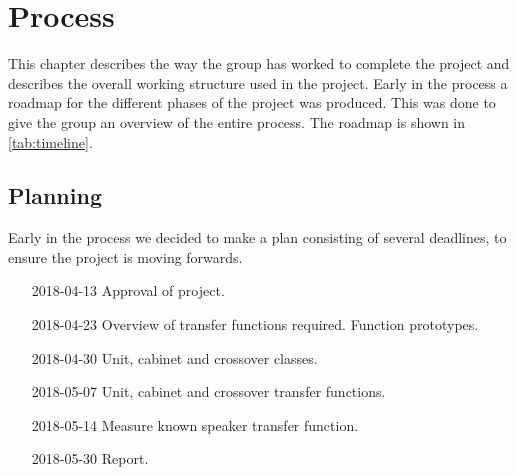 
\chapter{Process}
This chapter describes the way the group has worked to complete the project and describes the overall working structure used in the project.
Early in the process a roadmap for the different phases of the project was produced. This was done to give the group an overview of the entire process. The roadmap is shown in \cref{tab:timeline}.

\section{Planning}
Early in the process we decided to make a plan consisting of several deadlines, to ensure the project is moving forwards.

\begin{itemize}
	\item[2018-04-13] Approval of project.
	\item[2018-04-23] Overview of transfer functions required. Function prototypes.
	\item[2018-04-30] Unit, cabinet and crossover classes.
	\item[2018-05-07] Unit, cabinet and crossover transfer functions. 
	\item[2018-05-14] Measure known speaker transfer function. 
	\item[2018-05-30] Report.
\end{itemize}